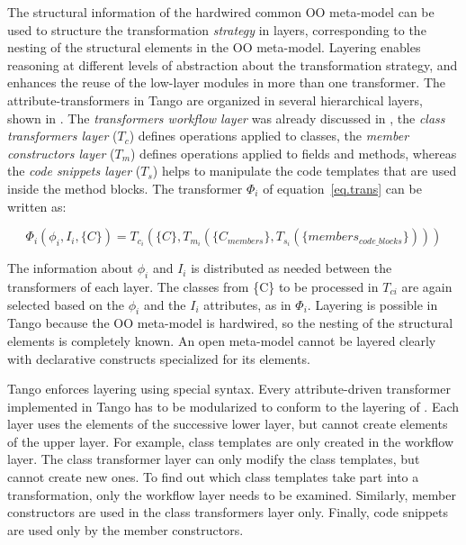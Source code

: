 The structural information of the hardwired common OO meta-model can be used to structure the transformation \textit{strategy} \cite{stratego.01} in layers, corresponding to the nesting of the structural elements in the OO meta-model. Layering enables reasoning at different levels of abstraction about the transformation strategy, and enhances the reuse of the low-layer modules in more than one transformer. The attribute-transformers in Tango are organized in several hierarchical layers, shown in . The \textit{transformers workflow layer} was already discussed in , the \textit{class transformers layer} ($T_c$) defines operations applied to classes, the \textit{member constructors layer} ($T_m$) defines operations applied to fields and methods, whereas the \textit{code snippets layer} ($T_s$) helps to manipulate the code templates that are used inside the method blocks. The transformer $\Phi_i$ of equation~\ref{eq.trans} can be written as:

\begin{equation}
\Phi_i(\phi_i, I_i, \{C\}) = T_{c_i}(\{C\},T_{m_i}(\{C_{members}\}, T_{s_i}(\{members_{code\_blocks}\}) ) )
\label{eq.layers}
\end{equation}

The information about $\phi_i$ and $I_i$ is distributed as needed between the transformers of each layer. The classes from \{C\} to be processed in $T_{ci}$ are again selected based on the $\phi_i$ and the $I_i$ attributes, as in $\Phi_i$. Layering is possible in Tango because the OO meta-model is hardwired, so the nesting of the structural elements is completely known. An open meta-model cannot be layered clearly with declarative constructs specialized for its elements. 

Tango enforces layering using special syntax. Every attribute-driven transformer implemented in Tango has to be modularized to conform to the layering of . Each layer uses the elements of the successive lower layer, but cannot create elements of the upper layer. For example, class templates are only created in the workflow layer. The class transformer layer can only modify the class templates, but cannot create new ones. To find out which class templates take part into a transformation, only the workflow layer needs to be examined. Similarly, member constructors are used in the class transformers layer only. Finally, code snippets are used only by the member constructors.

